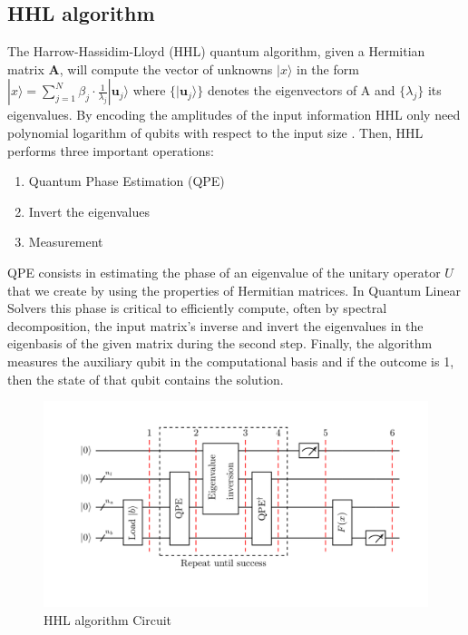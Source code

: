 \subsection{HHL algorithm}

The Harrow-Hassidim-Lloyd (HHL) quantum algorithm, given a Hermitian matrix \textbf{A}, will compute the vector of unknowns $|x\rangle$ in the form $|x \rangle = \sum_{j=1}^N \beta_j \cdot \frac{1}{\lambda_j} |\textbf{u}_j \rangle$ where $\{ |\textbf{u}_j \rangle \}$ denotes the eigenvectors of A and $\{\lambda_j\}$ its eigenvalues. By encoding the amplitudes of the input information HHL only need polynomial logarithm of qubits with respect to the input size \cite{duan_survey_2020}. Then, HHL performs three important operations:
\begin{enumerate}
    \item Quantum Phase Estimation (QPE)
    \item Invert the eigenvalues
    \item Measurement
\end{enumerate}
QPE consists in estimating the phase of an eigenvalue of the unitary operator $U$ that we create by using the properties of Hermitian matrices. In Quantum Linear Solvers this phase is critical to efficiently compute, often by spectral decomposition, the input matrix's inverse and invert the eigenvalues in the eigenbasis of the given matrix during the second step. Finally, the algorithm measures the auxiliary qubit in the computational basis and if the outcome is 1, then the state of that qubit contains the solution. 

\begin{figure}[h!]
    \centering
    \includegraphics[scale=0.35]{images/hhlcircuit.png}
    \caption{HHL algorithm Circuit}
    \label{fig:my_label}
\end{figure}


